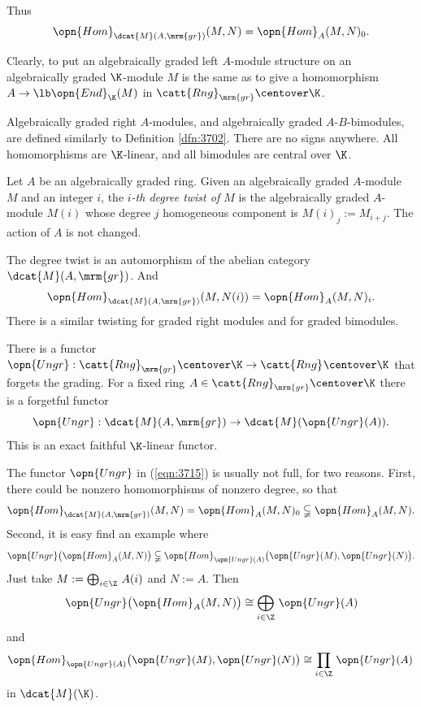Thus 
\begin{equation}  \label{eqn:3736}
\opn{Hom}_{\dcat{M}(A, \mrm{gr})}(M, N) = \opn{Hom}_{A}(M, N)_0 . 
\end{equation}

Clearly, to put an algebraically graded left $A$-module structure on an
algebraically graded $\K$-module $M$ is the same as to give a
homomorphism $A \to \lb \opn{End}_{\K}(M)$ in 
$\catt{Rng}_{\mrm{gr}} \centover \K$.

Algebraically graded right $A$-modules, and algebraically graded 
$A$-$B$-bi\-modules, are defined similarly to Definition \ref{dfn:3702}. There 
are no signs anywhere. 
All homomorphisms are $\K$-linear, and all bimodules are central over $\K$. 

\begin{dfn}  \label{dfn:3735}
Let $A$ be an algebraically graded ring. Given an algebraically graded 
$A$-module $M$ and an integer $i$, the {\em $i$-th degree twist of $M$} 
is the algebraically graded $A$-module $M(i)$ whose degree $j$ homogeneous 
component is $M(i)_j := M_{i + j}$.
The action of $A$ is not changed. 
\end{dfn}

The degree twist is an automorphism of the abelian category 
$\dcat{M}(A, \mrm{gr})$. And 
\[ \opn{Hom}_{\dcat{M}(A, \mrm{gr})}(M, N(i)) = \opn{Hom}_{A}(M, N)_i . \]
There is a similar twisting for graded right modules and for graded 
bimodules. 

There is a functor 
$\opn{Ungr} : \catt{Rng}_{\mrm{gr}} \centover \K \to 
\catt{Rng}_{} \centover \K$
that forgets the grading. For a fixed ring 
$A \in  \catt{Rng}_{\mrm{gr}} \centover \K$
there is a forgetful functor 
\begin{equation} \label{eqn:3715}
\opn{Ungr} : \dcat{M}(A, \mrm{gr}) \to \dcat{M}(\opn{Ungr}(A)) . 
\end{equation}
This is an exact faithful $\K$-linear functor. 

\begin{rem} \label{rem:3795}
The functor $\opn{Ungr}$ in (\ref{eqn:3715}) is usually not full, for two 
reasons. First, there could be nonzero homomorphisms of nonzero 
degree, so that 
\[ \opn{Hom}_{\dcat{M}(A, \mrm{gr})}(M, N) = 
\opn{Hom}_A(M, N)_0 \subsetneqq \opn{Hom}_A(M, N) . \]
Second, it is easy find an example where
\[ \opn{Ungr} \bigl( \opn{Hom}_A(M, N) \bigr) \subsetneqq
\opn{Hom}_{\opn{Ungr}(A)} \bigl( \opn{Ungr}(M), \opn{Ungr}(N) \bigr) . \]
Just take 
$M := \bigoplus_{i \in \Z} \, A(i)$ and $N := A$. Then
\[ \opn{Ungr} \bigl( \opn{Hom}_A(M, N) \bigr) \cong 
\bigoplus_{i \in \Z} \, \opn{Ungr}(A)  \]
and 
\[ \opn{Hom}_{\opn{Ungr}(A)} \bigl( \opn{Ungr}(M), \opn{Ungr}(N) \bigr) \cong 
\prod_{i \in \Z} \, \opn{Ungr}(A) \,  \]
in $\dcat{M}(\K)$.
\end{rem}

